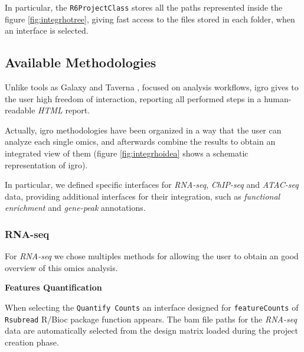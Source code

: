 In particular, the \lstinline!R6ProjectClass! stores all the paths represented inside the figure \ref{fig:integrhotree}, giving fast access to the files stored in each folder, when an interface is selected.


\subsection{Available Methodologies}

Unlike tools as Galaxy \cite{Hillman-Jackson2012} and Taverna \cite{Wolstencroft2013}, focused on analysis workflows, \gls{igro} gives to the user high freedom of interaction, reporting all performed steps in a human-readable \textit{HTML} report.
 
Actually, \gls{igro} methodologies have been organized in a way that the user can analyze each single omics, and afterwards combine the results to obtain an integrated view of them (figure \ref{fig:integrhoidea} shows a schematic representation of \gls{igro}).

In particular, we defined specific interfaces for \textit{RNA-seq}, \textit{ChIP-seq} and \textit{ATAC-seq} data, providing additional interfaces for their integration, such as \textit{functional enrichment} and \textit{gene-peak} annotations.


\subsubsection{RNA-seq}
For \textit{RNA-seq} we chose multiples methods for allowing the user to obtain an good overview of this omics analysis.


{\setlength{\parindent}{0cm}\textbf{Features Quantification}}

When selecting the \lstinline!Quantify Counts! an interface designed for \lstinline!featureCounts! of \lstinline!Rsubread! R/Bioc package function \cite{Liao2014} appears.
The  \gls{bam} file paths for the \textit{RNA-seq} data are automatically selected from the   design matrix loaded during the project creation phase.

